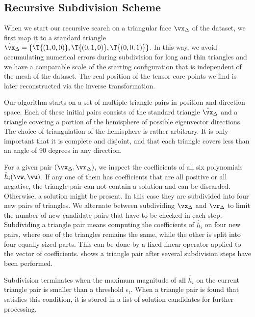 \subsection{Recursive Subdivision Scheme} %
\label{sub:recursive_subdivision_scheme}
%
When we start our recursive search on a triangular face $\vx_\Delta$ of the
dataset, we first map it to a standard triangle
$\hat\vx_\Delta = \{\T{(1, 0, 0)}, \T{(0,1,0)}, \T{(0, 0, 1)}\}$.
%
In this way, we avoid accumulating numerical errors during subdivision for long
and thin triangles and we have a comparable scale of the starting configuration
that is independent of the mesh of the dataset.
% 
The real position of the tensor core points we find is later reconstructed via
the inverse transformation.
%

%
Our algorithm starts on a set of multiple triangle pairs in position and
direction space.
%
Each of these initial pairs consists of the standard triangle
$\hat\vx_\Delta$ and a triangle covering a portion of the hemisphere of
possible eigenvector directions.
% 
The choice of triangulation of the hemisphere is rather arbitrary.
% 
It is only important that it is complete and disjoint, and that each triangle
covers less than an angle of 90 degrees in any direction.
% 

% 
For a given pair $(\vx_\Delta, \vr_\Delta)$, we inspect the coefficients
of all six polynomials $\hat{h}_i(\vw, \vu)$.
%
If any one of them has coefficients that are all positive or all negative, the
triangle pair can not contain a solution and can be discarded.
%
Otherwise, a solution might be present.
%
In this case they are subdivided into four new pairs of triangles.
%
We alternate between subdividing $\vx_\Delta$ and $\vr_\Delta$ to limit
the number of new candidate pairs that have to be checked in each step.
%
Subdividing a triangle pair means computing the coefficients of $\hat{h}_i$ on
four new pairs, where one of the triangles remains the same, while the other is
split into four equally-sized parts.
%
This can be done by a fixed linear operator applied to the vector of
coefficients.
%
 shows a triangle pair after several subdivision
steps have been performed.
%



%
Subdivision terminates when the maximum magnitude of all $\hat{h}_i$ on the
current triangle pair is smaller than a threshold $\epsilon_{\mathrm{t}}$.
%
When a triangle pair is found that satisfies this condition, it is stored in a
list of solution candidates for further processing.
%

